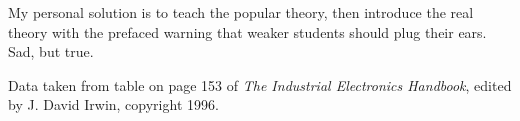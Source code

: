 My personal solution is to teach the popular theory, then introduce the real theory with the prefaced warning that weaker students should plug their ears.  Sad, but true.

\vskip 10pt

Data taken from table on page 153 of {\it The Industrial Electronics Handbook}, edited by J. David Irwin, copyright 1996.




